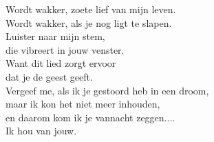 \begin{translation}
Wordt wakker, zoete lief van mijn leven.\\
Wordt wakker, als je nog ligt te slapen.\\
Luister naar mijn stem,\\
die vibreert in jouw venster.\\
Want dit lied zorgt ervoor\\
dat je de geest geeft.\\
\vspace*{1\baselineskip}
Vergeef me, als ik je gestoord heb in een droom,\\
maar ik kon het niet meer inhouden,\\
en daarom kom ik je vannacht zeggen....\\
Ik hou van jouw.\\
\end{translation}
